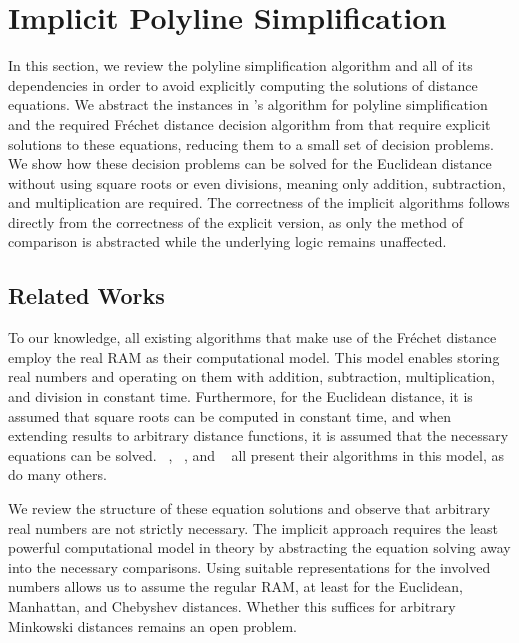 \section{Implicit Polyline Simplification}\label{sec:implicit_polyline_simplification}
In this section, we review the polyline simplification algorithm and all of its dependencies in order to avoid explicitly computing the solutions of distance equations. We abstract the instances in \citeauthor{on_optimal_polyline_simplification_using_the_hausdorff_and_frechet_distance}'s algorithm for polyline simplification and the required Fréchet distance decision algorithm from \citeauthor{computing_the_frechet_distance_between_two_polygonal_curves} that require explicit solutions to these equations, reducing them to a small set of decision problems.
We show how these decision problems can be solved for the Euclidean distance without using square roots or even divisions, meaning only addition, subtraction, and multiplication are required. The correctness of the implicit algorithms follows directly from the correctness of the explicit version, as only the method of comparison is abstracted while the underlying logic remains unaffected.

\subsection{Related Works}
To our knowledge, all existing algorithms that make use of the Fréchet distance employ the real RAM \cite{computational_geometry_shamos} as their computational model. This model enables storing real numbers and operating on them with addition, subtraction, multiplication, and division in constant time. Furthermore, for the Euclidean distance, it is assumed that square roots can be computed in constant time, and when extending results to arbitrary distance functions, it is assumed that the necessary equations can be solved. \citeauthor{computing_the_frechet_distance_between_two_polygonal_curves}~\cite{computing_the_frechet_distance_between_two_polygonal_curves}, \citeauthor{on_optimal_polyline_simplification_using_the_hausdorff_and_frechet_distance}~\cite{on_optimal_polyline_simplification_using_the_hausdorff_and_frechet_distance}, and \citeauthor{polyline_simplification_has_cubic_complexity_bringmannetal}~\cite{polyline_simplification_has_cubic_complexity_bringmannetal} all present their algorithms in this model, as do many others.

We review the structure of these equation solutions and observe that arbitrary real numbers are not strictly necessary. The implicit approach requires the least powerful computational model in theory by abstracting the equation solving away into the necessary comparisons. Using suitable representations for the involved numbers allows us to assume the regular RAM, at least for the Euclidean, Manhattan, and Chebyshev distances. Whether this suffices for arbitrary Minkowski distances remains an open problem.


